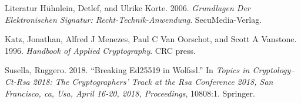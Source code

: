 \documentclass[
  9pt,
  ignorenonframetext,
  aspectratio=169,
]{beamer}
\newlength{\cslhangindent}
\newenvironment{cslreferences}%
  {\setlength{\parindent}{0pt}%
  \everypar{\setlength{\hangindent}{\cslhangindent}}\ignorespaces}%
  {\par}
\begin{document}
\begin{frame}{Literatur}
\protect\hypertarget{literatur}{}
\hypertarget{refs}{}
\begin{cslreferences}
\leavevmode\hypertarget{ref-huhnlein2006grundlagen}{}%
Hühnlein, Detlef, and Ulrike Korte. 2006. \emph{Grundlagen Der
Elektronischen Signatur: Recht-Technik-Anwendung}. SecuMedia-Verlag.

\leavevmode\hypertarget{ref-katz1996handbook}{}%
Katz, Jonathan, Alfred J Menezes, Paul C Van Oorschot, and Scott A
Vanstone. 1996. \emph{Handbook of Applied Cryptography}. CRC press.

\leavevmode\hypertarget{ref-susella2018breaking}{}%
Susella, Ruggero. 2018. ``Breaking Ed25519 in Wolfssl.'' In \emph{Topics
in Cryptology--Ct-Rsa 2018: The Cryptographers' Track at the Rsa
Conference 2018, San Francisco, ca, Usa, April 16-20, 2018,
Proceedings}, 10808:1. Springer.
\end{cslreferences}
\end{frame}
\end{document}

